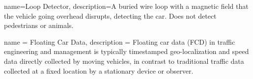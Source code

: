 {
        name=Loop Detector,
        description={A buried wire loop with a magnetic field that the vehicle going overhead disrupts, detecting the car.  Does not detect pedestrians or animals.  }
}

{
	name = Floating Car Data,
	description = {Floating car data (FCD) in traffic engineering and management is typically timestamped geo-localization and speed data directly collected by moving vehicles, in contrast to traditional traffic data collected at a fixed location by a stationary device or observer.}
}





